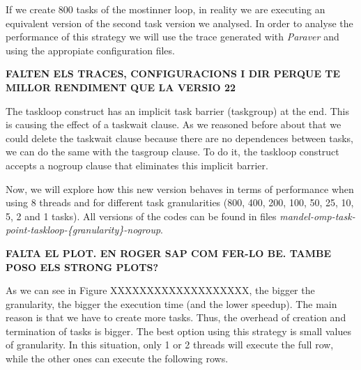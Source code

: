 \documentclass[12pt, a4paper]{article}
\begin{document}
If we create 800 tasks of the mostinner loop, in reality we are executing an equivalent version of the second task version we analysed. In order to analyse the performance of this strategy we will use the trace generated with \textit{Paraver} and using the appropiate configuration files.

\textbf{\large{\large{FALTEN ELS TRACES, CONFIGURACIONS I DIR PERQUE TE MILLOR RENDIMENT QUE LA VERSIO 22}}}

The taskloop construct has an implicit task barrier (taskgroup) at the end. This is causing the effect of a taskwait clause. As we reasoned before about that we could delete the taskwait clause because there are no dependences between tasks, we can do the same with the tasgroup clause. To do it, the taskloop construct accepts a nogroup clause that eliminates this implicit barrier.

Now, we will explore how this new version behaves in terms of performance when using 8 threads and for different task granularities (800, 400, 200, 100, 50, 25, 10, 5, 2 and 1 tasks). All versions of the codes can be found in files \textit{mandel-omp-task-point-taskloop-\{granularity\}-nogroup}.

\textbf{\large{\large{FALTA EL PLOT. EN ROGER SAP COM FER-LO BE. TAMBE POSO ELS STRONG PLOTS?}}}

As we can see in Figure XXXXXXXXXXXXXXXXXXX, the bigger the granularity, the bigger the execution time (and the lower speedup). The main reason is that we have to create more tasks. Thus, the overhead of creation and termination of tasks is bigger. The best option using this strategy is small values of granularity. In this situation, only 1 or 2 threads will execute the full row, while the other ones can execute the following rows.
\end{document}
